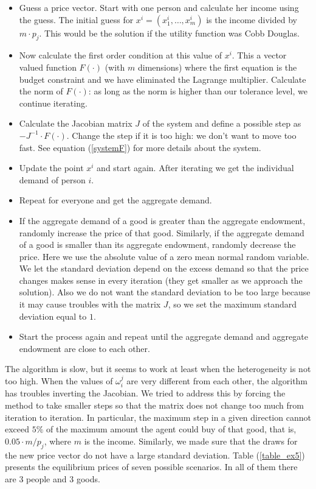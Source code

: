 \documentclass[a4paper,12pt]{article}
\begin{document}
    \begin{itemize}
        \item Guess a price vector. Start with one person and calculate her income using the guess. The initial guess for $x^i=(x^i_1,\dots, x^i_m)$ is the income divided by $m\cdot p_j$. This would be the solution if the utility function was Cobb Douglas. 
        \item Now calculate the first order condition at this value of $x^i$. This a vector valued function $F(\cdot)$ (with $m$ dimensions) where the first equation is the budget constraint and we have eliminated the Lagrange multiplier. Calculate the norm of $F(\cdot)$: as long as the norm is higher than our tolerance level, we continue iterating. 
        \item Calculate the Jacobian matrix $J$ of the system and define a possible step as $-J^{-1}\cdot F(\cdot)$. Change the step if it is too high: we don't want to move too fast. See equation (\ref{systemF}) for more details about the system. 
        
        \item Update the point $x^i$ and start again. After iterating we get the individual demand of person $i$. 
        
        \item Repeat for everyone and get the aggregate demand. 
        
        \item If the aggregate demand of a good is greater than the aggregate endowment, randomly increase the price of that good. Similarly, if the aggregate demand of a good is smaller than its aggregate endowment, randomly decrease the price. Here we use the absolute value of a zero mean normal random variable. We let the standard deviation depend on the excess demand so that the price changes makes sense in every iteration (they get smaller as we approach the solution). Also we do not want the standard deviation to be too large because it may cause troubles with the matrix $J$, so we set the maximum standard deviation equal to $1$. 
        
        \item Start the process again and repeat until the aggregate demand and aggregate endowment are close to each other. 
    \end{itemize}
    
    The algorithm is slow, but it seems to work at least when the heterogeneity is not too high. When the values of $\omega_i^j$ are very different from each other, the algorithm has troubles inverting the Jacobian. We tried to address this by forcing the method to take smaller steps so that the matrix does not change too much from iteration to iteration. In particular, the maximum step in a given direction cannot exceed $5\%$ of the maximum amount the agent could buy of that good, that is, $0.05 \cdot m/p_j$, where $m$ is the income. Similarly, we made sure that the draws for the new price vector do not have a large standard deviation. Table (\ref{table_ex5}) presents the equilibrium prices of seven possible scenarios. In all of them there are $3$ people and $3$ goods.
    
\end{document}
